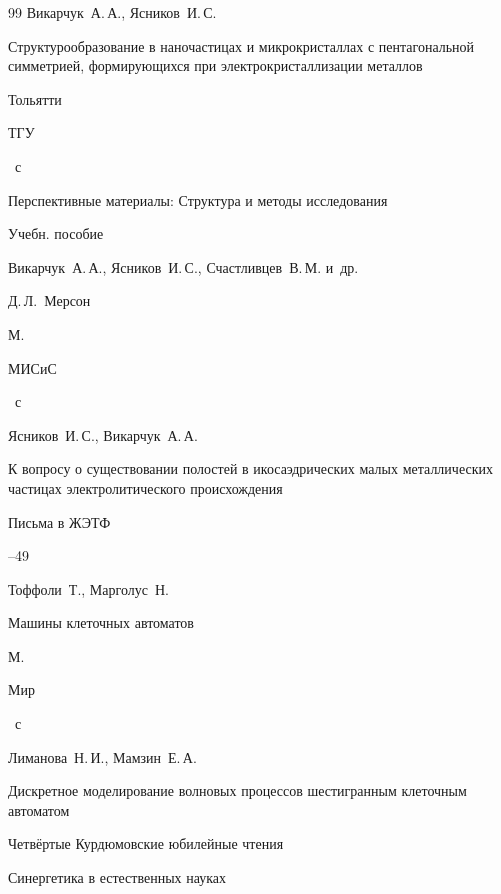 \begin{thebibliography}{99}
\by Викарчук~А.\,А.,  Ясников~И.\,С.

\book Структурообразование в наночастицах и микрокристаллах с пентагональной симметрией,  формирующихся при электрокристаллизации металлов

\publaddr Тольятти

\publ ТГУ


~с




\book Перспективные материалы: Структура и методы исследования

\bookinfo Учебн. пособие

\by Викарчук~А.\,А.,  Ясников~И.\,С.,  Счастливцев~В.\,М. и~др.

\ed Д.\,Л.~Мерсон

\publaddr М.

\publ МИСиС


~с




\by Ясников~И.\,С.,  Викарчук~А.\,А.

\paper  К вопросу о существовании полостей в икосаэдрических малых металлических частицах электролитического происхождения

\jour Письма в ЖЭТФ




--49




\by Тоффоли~Т.,  Марголус~Н.

\book Машины клеточных автоматов

\publaddr  М.

\publ Мир


~с




\by Лиманова~Н.\,И.,  Мамзин~Е.\,А.

\paper Дискретное моделирование волновых процессов шестигранным клеточным автоматом

\procinfo Четвёртые Курдюмовские юбилейные чтения

\inbook Синергетика в естественных науках


\end{thebibliography}
